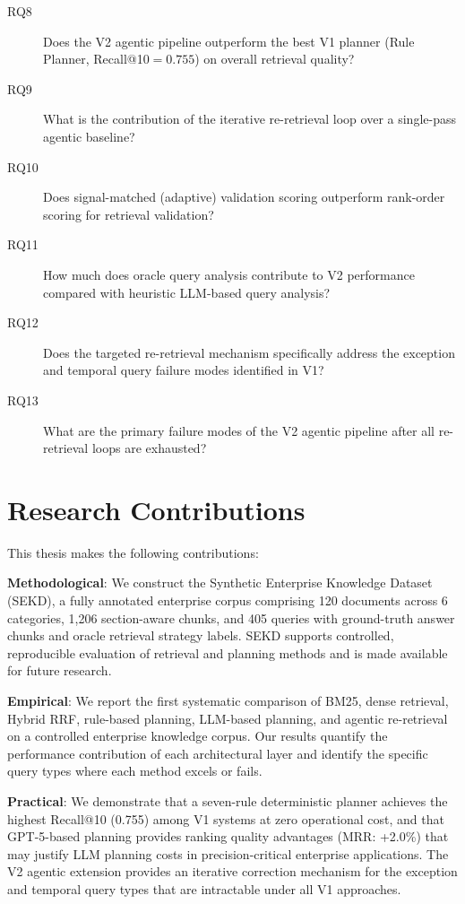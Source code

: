 \begin{description}
    \item[RQ8]  Does the V2 agentic pipeline outperform the best V1 planner (Rule Planner, Recall@10$={0.755}$) on overall retrieval quality?
    \item[RQ9]  What is the contribution of the iterative re-retrieval loop over a single-pass agentic baseline?
    \item[RQ10] Does signal-matched (adaptive) validation scoring outperform rank-order scoring for retrieval validation?
    \item[RQ11] How much does oracle query analysis contribute to V2 performance compared with heuristic LLM-based query analysis?
    \item[RQ12] Does the targeted re-retrieval mechanism specifically address the exception and temporal query failure modes identified in V1?
    \item[RQ13] What are the primary failure modes of the V2 agentic pipeline after all re-retrieval loops are exhausted?
\end{description}

\section{Research Contributions}
\label{sec:intro_contributions}

This thesis makes the following contributions:

\textbf{Methodological}: We construct the Synthetic Enterprise Knowledge Dataset (SEKD), a fully annotated enterprise corpus comprising 120 documents across 6 categories, 1,206 section-aware chunks, and 405 queries with ground-truth answer chunks and oracle retrieval strategy labels. SEKD supports controlled, reproducible evaluation of retrieval and planning methods and is made available for future research.

\textbf{Empirical}: We report the first systematic comparison of BM25, dense retrieval, Hybrid RRF, rule-based planning, LLM-based planning, and agentic re-retrieval on a controlled enterprise knowledge corpus. Our results quantify the performance contribution of each architectural layer and identify the specific query types where each method excels or fails.

\textbf{Practical}: We demonstrate that a seven-rule deterministic planner achieves the highest Recall@10 (0.755) among V1 systems at zero operational cost, and that GPT-5-based planning provides ranking quality advantages (MRR: +2.0\%) that may justify LLM planning costs in precision-critical enterprise applications. The V2 agentic extension provides an iterative correction mechanism for the exception and temporal query types that are intractable under all V1 approaches.


